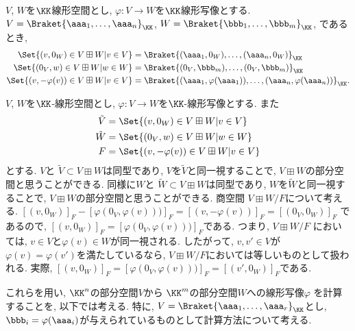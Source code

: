 \begin{remark}
  $V$, $W$を$\KK$線形空間とし,
  $\varphi\colon V\to W$を$\KK$線形写像とする.
  $V=\Braket{\aaa_1,\ldots,\aaa_n}_{\KK}$,
  $W=\Braket{\bbb_1,\ldots,\bbb_m}_{\KK}$,
  であるとき,
  \begin{align*}
    \Set{(v,0_W)\in V\boxplus W|v\in V}
    &=\Braket{(\aaa_1,0_W),\ldots,(\aaa_n,0_W)}_{\KK}\\
    \Set{(0_V,w)\in V\boxplus W|w\in W}
    &=\Braket{(0_V,\bbb_m),\ldots,(0_V,\bbb_m)}_{\KK}\\
    \Set{(v,-\varphi(v))\in V\boxplus W|v\in V}
    &=\Braket{(\aaa_1,\varphi(\aaa_1)),\ldots,(\aaa_n,\varphi(\aaa_n))}_{\KK}.
  \end{align*}  
\end{remark}
\begin{remark}
  $V$, $W$を$\KK$-線形空間とし, $\varphi\colon V\to W$を$\KK$-線形写像とする.
  また
  \begin{align*}
    \tilde V &=\Set{(v,0_W)\in V\boxplus W|v\in V}\\
    \tilde W &=\Set{(0_V,w)\in V\boxplus W|w\in W}\\
    F&=\Set{(v,-\varphi(v))\in V\boxplus W|v\in V}
  \end{align*}
  とする.
  $V$と
  $\tilde V\subset V\boxplus W$は同型であり, $V$を$\tilde V$と同一視することで,
  $V\boxplus W$の部分空間と思うことができる.
  同様に$W$と
  $\tilde W\subset V\boxplus W$は同型であり, $W$を$\tilde W$と同一視することで,
  $V\boxplus W$の部分空間と思うことができる. 
  商空間
  $V\boxplus W/F$について考える.
  $[(v,0_W)]_F-[\varphi(0_V,\varphi(v)))]_F=[(v,-\varphi(v))]_F=[(0_V,0_W)]_F$
  であるので,
  $[(v,0_W)]_F=[\varphi(0_V,\varphi(v)))]_F$である.
  つまり,
  $V\boxplus W/F$
  においては, $v\in V$と$\varphi(v)\in W$が同一視される.
  したがって, $v,v'\in V$が$\varphi(v)=\varphi(v')$を満たしているなら,
  $V\boxplus W/F$においては等しいものとして扱われる.
  実際,
  $[(v,0_W)]_F=[\varphi(0_V,\varphi(v)))]_F=[(v',0_W)]_F$である.  
\end{remark}

これらを用い,
$\KK^n$の部分空間$V$から
$\KK^m$の部分空間$W$への線形写像$\varphi$
を計算することを, 以下では考える.
特に,
$V=\Braket{\aaa_1,\ldots,\aaa_r}_{\KK}$とし,
$\bbb_i=\varphi(\aaa_i)$が与えられているものとして計算方法について考える.

